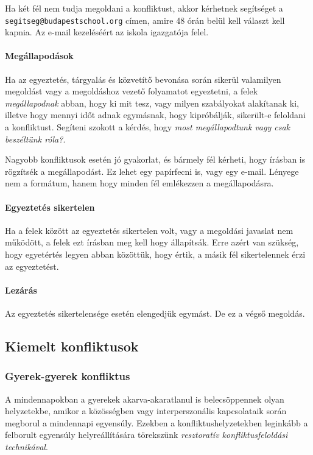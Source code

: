 Ha két fél nem tudja megoldani a konfliktust, akkor kérhetnek segítséget a \texttt{segitseg@budapestschool.org} címen, amire 48 órán belül kell választ kell kapnia. Az e-mail kezeléséért az iskola igazgatója felel.

\paragraph{Megállapodások}

Ha az egyeztetés, tárgyalás és közvetítő bevonása során sikerül valamilyen megoldást vagy a megoldáshoz vezető folyamatot egyeztetni, a felek \emph{megállapodnak} abban, hogy ki mit tesz, vagy milyen szabályokat alakítanak ki, illetve hogy mennyi időt adnak egymásnak, hogy kipróbálják, sikerült-e feloldani a konfliktust. Segíteni szokott a kérdés, hogy \emph{most megállapodtunk vagy csak beszéltünk róla?}.

Nagyobb konfliktusok esetén jó gyakorlat, és bármely fél kérheti, hogy írásban is rögzítsék a megállapodást. Ez lehet egy papírfecni is, vagy egy e-mail. Lényege nem a formátum, hanem  hogy minden fél emlékezzen a megállapodásra.

\paragraph{Egyeztetés sikertelen}

Ha a felek között az egyeztetés sikertelen volt, vagy a megoldási javaslat nem működött, a felek ezt írásban meg kell hogy állapítsák. Erre azért van szükség, hogy egyetértés legyen abban közöttük, hogy értik, a másik fél sikertelennek érzi az egyeztetést.

\paragraph{Lezárás}

Az egyeztetés sikertelensége esetén elengedjük egymást. De ez a végső megoldás.

\subsection{Kiemelt konfliktusok}

\subsubsection{Gyerek-gyerek konfliktus}

A mindennapokban a gyerekek akarva-akaratlanul is belecsöppennek olyan hely\-ze\-tek\-be, amikor a közösségben vagy interperszonális kapcsolataik során megborul a mindennapi egyensúly. Ezekben a konfliktushelyzetekben leginkább a felborult egyensúly helyreállítására törekszünk \emph{resztoratív konfliktusfeloldási technikával}.

